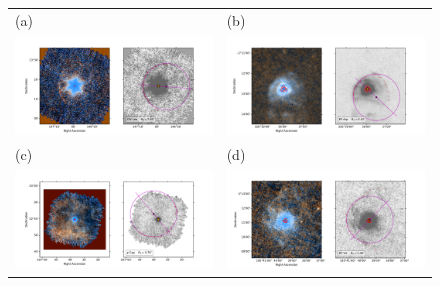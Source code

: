 \begin{figure}
  \setlength\tabcolsep{0pt}
  \begin{tabular}{ll}
    (a) & (b) \\
    \includegraphics[trim=10 0 65 20, clip]{figs/cwleo-imageplot}
    & \includegraphics[trim=10 0 65 20, clip]{figs/epaqr-imageplot} \\
    (c) & (d) \\
    \includegraphics[trim=10 0 65 20, clip]{figs/khicyg-imageplot}
    & \includegraphics[trim=10 0 65 20, clip]{figs/rtvir-imageplot} \\

\end{tabular}
\end{figure}
